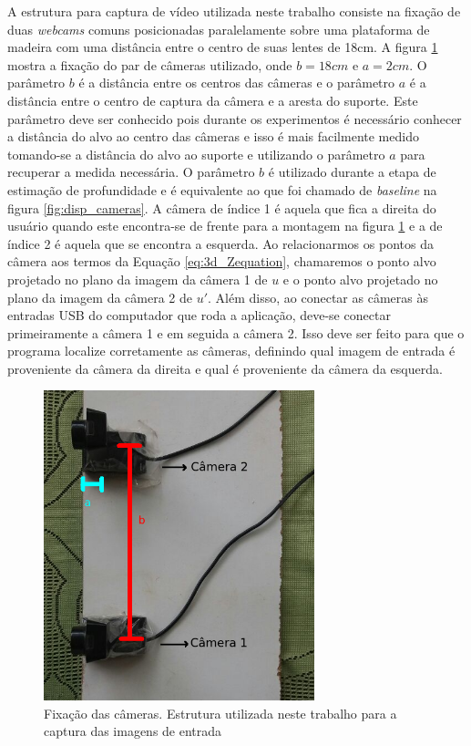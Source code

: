 A estrutura para captura de vídeo utilizada neste trabalho consiste na fixação de duas \textit{webcams} comuns posicionadas paralelamente sobre uma plataforma de madeira com uma distância entre o centro de suas lentes de 18cm. A figura \ref{fig:setupCameras} mostra a fixação do par de câmeras utilizado, onde $b = 18cm$ e $a = 2cm$. O parâmetro $b$ é a distância entre os centros das câmeras e o parâmetro $a$ é a distância entre o centro de captura da câmera e a aresta do suporte. Este parâmetro deve ser conhecido pois durante os experimentos é necessário conhecer a distância do alvo ao centro das câmeras e isso é mais facilmente medido tomando-se a distância do alvo ao suporte e utilizando o parâmetro $a$ para recuperar a medida necessária. O parâmetro $b$ é utilizado durante a etapa de estimação de profundidade e é equivalente ao que foi chamado de \textit{baseline} na figura \ref{fig:disp_cameras}. A câmera de índice 1 é aquela que fica a direita do usuário quando este encontra-se de frente para a montagem na figura \ref{fig:setupCameras} e a de índice 2 é aquela que se encontra a esquerda. Ao relacionarmos os pontos da câmera aos termos da Equação \ref{eq:3d_Zequation}, chamaremos o ponto alvo projetado no plano da imagem da câmera 1 de $u$ e o ponto alvo projetado no plano da imagem da câmera 2 de $u'$. Além disso, ao conectar as câmeras às entradas USB do computador que roda a aplicação, deve-se conectar primeiramente a câmera 1 e em seguida a câmera 2. Isso deve ser feito para que o programa localize corretamente as câmeras, definindo qual imagem de entrada é proveniente da câmera da direita e qual é proveniente da câmera da esquerda. 


\begin{figure}[!htb]
\centering
\includegraphics[width=0.7\textwidth]{figs/setupExperimento-marcado_edit.png}
\caption{Fixação das câmeras. Estrutura utilizada neste trabalho para a captura das imagens de entrada}
\label{fig:setupCameras}
\end{figure}



